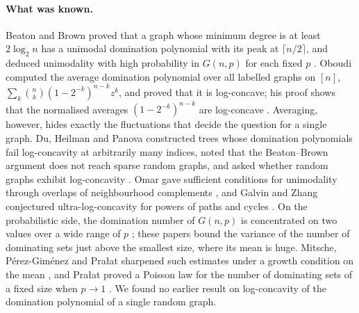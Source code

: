 \documentclass[11pt]{article}
\theoremstyle{remark}
\begin{document}
\paragraph{What was known.} Beaton and Brown proved that a graph whose minimum degree is at least $2\log_2n$ has a unimodal domination polynomial with its peak at $\lceil n/2\rceil$, and deduced unimodality with high probability in $G(n,p)$ for each fixed $p$ \cite[Theorems~3.2--3.3]{BB}. Oboudi computed the average domination polynomial over all labelled graphs on $[n]$, $\sum_k\binom nk(1-2^{-k})^{n-k}z^k$, and proved that it is log-concave; his proof shows that the normalised averages $(1-2^{-k})^{n-k}$ are log-concave \cite[Theorems~2.1--2.2]{Oboudi}. Averaging, however, hides exactly the fluctuations that decide the question for a single graph. Du, Heilman and Panova constructed trees whose domination polynomials fail log-concavity at arbitrarily many indices, noted that the Beaton--Brown argument does not reach sparse random graphs, and asked whether random graphs exhibit log-concavity \cite{DHP}. Omar gave sufficient conditions for unimodality through overlaps of neighbourhood complements \cite{Omar}, and Galvin and Zhang conjectured ultra-log-concavity for powers of paths and cycles \cite[Conjecture~1.8]{GZ}. On the probabilistic side, the domination number of $G(n,p)$ is concentrated on two values over a wide range of $p$ \cite{WG,GLS,BWZ}; these papers bound the variance of the number of dominating sets just above the smallest size, where its mean is huge. Mitsche, P\'erez-Gim\'enez and Pra{\l}at sharpened such estimates under a growth condition on the mean \cite[Proposition~8]{MPP}, and Pra{\l}at proved a Poisson law for the number of dominating sets of a fixed size when $p\to1$ \cite[Theorem~2.1]{Pralat}. We found no earlier result on log-concavity of the domination polynomial of a single random graph.
\end{document}
